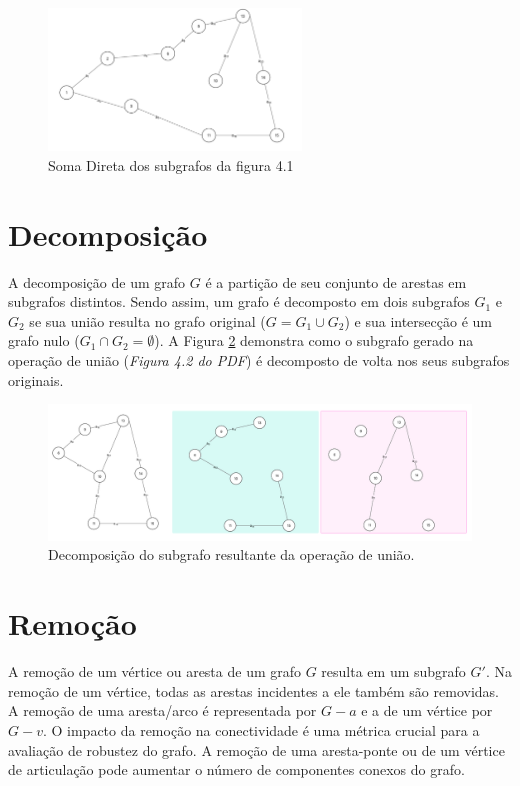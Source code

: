 \begin{figure}[!h]
	\centering
	\includegraphics[width=0.6\textwidth]{figuras/subgrafos/subgrafo_soma_direta.png}
	\caption{Soma Direta dos subgrafos da figura 4.1}
	\label{fig:somaDiretaGrafos}
\end{figure}

\section{Decomposição}\label{sec:decomposicao}
A decomposição de um grafo $G$ é a partição de seu conjunto de arestas em subgrafos distintos. Sendo assim, um grafo é decomposto em dois subgrafos $G_1$ e $G_2$ se sua união resulta no grafo original ($G = G_1 \cup G_2$) e sua intersecção é um grafo nulo ($G_1 \cap G_2 = \emptyset$). A Figura \ref{fig:decomposicao} demonstra como o subgrafo gerado na operação de união (\textit{Figura 4.2 do PDF}) é decomposto de volta nos seus subgrafos originais.

\begin{figure}[!h]
    \centering
    \includegraphics[width=1\textwidth]{figuras/decomposicao.png}
    \caption{Decomposição do subgrafo resultante da operação de união.}
    \label{fig:decomposicao}
\end{figure}

\section{Remoção}\label{sec:remocao}
A remoção de um vértice ou aresta de um grafo $G$ resulta em um subgrafo $G'$. Na remoção de um vértice, todas as arestas incidentes a ele também são removidas. A remoção de uma aresta/arco é representada por $G - a$ e a de um vértice por $G - v$. O impacto da remoção na conectividade é uma métrica crucial para a avaliação de robustez do grafo. A remoção de uma aresta-ponte ou de um vértice de articulação pode aumentar o número de componentes conexos do grafo.

